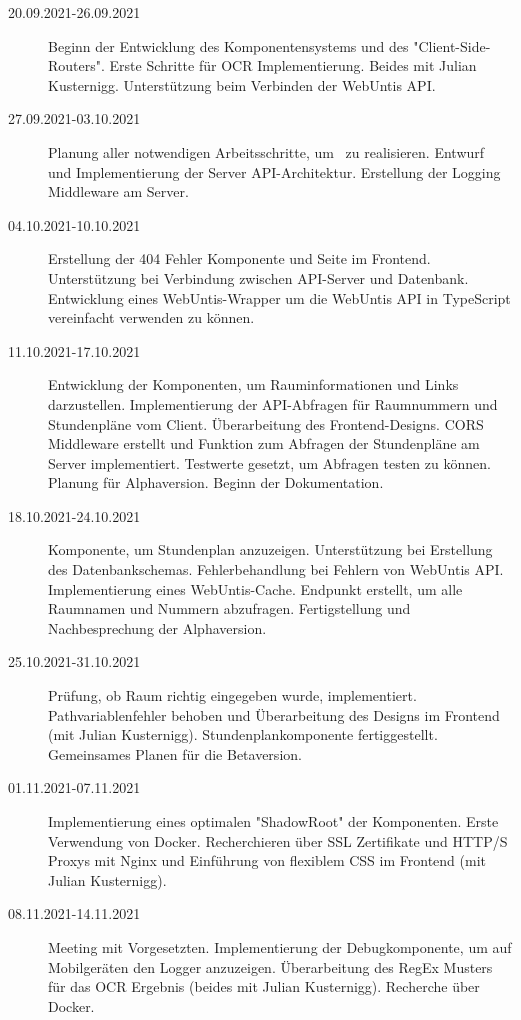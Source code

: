 
\begin{description}
    \item[20.09.2021-26.09.2021] Beginn der Entwicklung des Komponentensystems und des "Client-Side-Routers". Erste Schritte für OCR Implementierung. Beides mit Julian Kusternigg. Unterstützung beim Verbinden der WebUntis API.
    \item[27.09.2021-03.10.2021] Planung aller notwendigen Arbeitsschritte, um \ZELIA\ zu realisieren. Entwurf und Implementierung der Server API-Architektur. Erstellung der Logging Middleware am Server.
    \item[04.10.2021-10.10.2021] Erstellung der 404 Fehler Komponente und Seite im Frontend. Unterstützung bei Verbindung zwischen API-Server und Datenbank. Entwicklung eines WebUntis-Wrapper um die WebUntis API in TypeScript vereinfacht verwenden zu können.
    \item[11.10.2021-17.10.2021] Entwicklung der Komponenten, um Rauminformationen und Links darzustellen. Implementierung der API-Abfragen für Raumnummern und Stundenpläne vom Client. Überarbeitung des Frontend-Designs. CORS Middleware erstellt und Funktion zum Abfragen der Stundenpläne am Server implementiert. Testwerte gesetzt, um Abfragen testen zu können. Planung für Alpha\-version. Beginn der Dokumentation. 
    \item[18.10.2021-24.10.2021] Komponente, um Stundenplan anzuzeigen. Unter\-stützung \linebreak bei Erstellung des Datenbank\-schemas. Fehler\-behandlung bei Fehlern von Web\-Untis API. Implementierung eines Web\-Untis-Cache. Endpunkt erstellt, um alle Raumnamen und Nummern abzufragen. Fertig\-stellung und Nach\-besprechung der Alpha\-version.
    \item[25.10.2021-31.10.2021] Prüfung, ob Raum richtig eingegeben wurde, implementiert. Pathvariablenfehler behoben und Überarbeitung des Designs im Frontend (mit Julian Kusternigg). Stundenplankomponente fertiggestellt. Gemeinsames Planen für die Betaversion. 
    \item[01.11.2021-07.11.2021] Implementierung eines optimalen "ShadowRoot" der Komponenten. Erste Verwendung von Docker. Recherchieren über SSL Zertifikate und HTTP/S Proxys mit Nginx und Einführung von flexiblem CSS im Frontend (mit Julian Kusternigg).
    \item[08.11.2021-14.11.2021] Meeting mit Vorgesetzten. Implementierung der Debugkomponente, um auf Mobilgeräten den Logger anzuzeigen. Überarbeitung des RegEx Musters für das OCR Ergebnis (beides mit Julian Kusternigg). Recherche über Docker.

\end{description}
